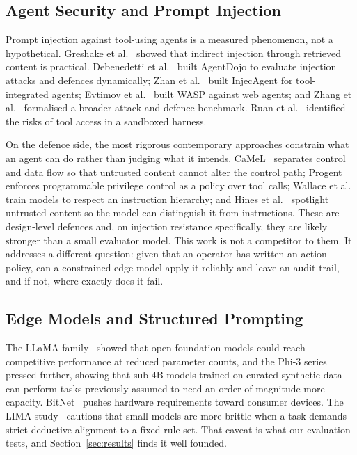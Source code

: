 \documentclass[journal,onecolumn,12pt]{IEEEtran}
\begin{document}
\subsection{Agent Security and Prompt Injection}
Prompt injection against tool-using agents is a measured phenomenon, not a hypothetical. Greshake et al.~\cite{greshake2023} showed that indirect injection through retrieved content is practical. Debenedetti et al.~\cite{debenedetti2024} built AgentDojo to evaluate injection attacks and defences dynamically; Zhan et al.~\cite{zhan2024} built InjecAgent for tool-integrated agents; Evtimov et al.~\cite{evtimov2025} built WASP against web agents; and Zhang et al.~\cite{zhang2025asb} formalised a broader attack-and-defence benchmark. Ruan et al.~\cite{ruan2023} identified the risks of tool access in a sandboxed harness.

On the defence side, the most rigorous contemporary approaches constrain what an agent can do rather than judging what it intends. CaMeL~\cite{debenedetti2025} separates control and data flow so that untrusted content cannot alter the control path; Progent~\cite{shi2025} enforces programmable privilege control as a policy over tool calls; Wallace et al.~\cite{wallace2024} train models to respect an instruction hierarchy; and Hines et al.~\cite{hines2024} spotlight untrusted content so the model can distinguish it from instructions. These are design-level defences and, on injection resistance specifically, they are likely stronger than a small evaluator model. This work is not a competitor to them. It addresses a different question: given that an operator has written an action policy, can a constrained edge model apply it reliably and leave an audit trail, and if not, where exactly does it fail.

\subsection{Edge Models and Structured Prompting}
The LLaMA family~\cite{touvron2023} showed that open foundation models could reach competitive performance at reduced parameter counts, and the Phi-3 series~\cite{abdin2024} pressed further, showing that sub-4B models trained on curated synthetic data can perform tasks previously assumed to need an order of magnitude more capacity. BitNet~\cite{ma2024} pushes hardware requirements toward consumer devices. The LIMA study~\cite{zhou2023} cautions that small models are more brittle when a task demands strict deductive alignment to a fixed rule set. That caveat is what our evaluation tests, and Section~\ref{sec:results} finds it well founded.
\end{document}
